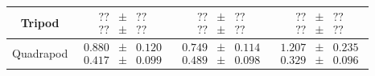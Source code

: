 \documentclass[conference]{IEEEtran}
\begin{document}
\begin{table}[t]
\begin{center}
\begin{tabular}[c]{cccc}
        \midrule
        Tripod & $\begin{matrix}??\\??\end{matrix} \begin{matrix}\pm\\\pm\end{matrix} \begin{matrix}??\\ ??\end{matrix}$ & $\begin{matrix}??\\??\end{matrix} \begin{matrix}\pm\\\pm\end{matrix} \begin{matrix}??\\ ??\end{matrix}$ & $\begin{matrix}??\\??\end{matrix} \begin{matrix}\pm\\\pm\end{matrix} \begin{matrix}??\\??\end{matrix}$ \\
        \midrule
        Quadrapod & $\begin{matrix}0.880\\0.417\end{matrix} \begin{matrix}\pm\\\pm\end{matrix} \begin{matrix}0.120\\ 0.099\end{matrix}$ & $\begin{matrix}0.749\\0.489\end{matrix} \begin{matrix}\pm\\\pm\end{matrix} \begin{matrix}0.114\\ 0.098\end{matrix}$ & $\begin{matrix}1.207\\0.329\end{matrix} \begin{matrix}\pm\\\pm\end{matrix} \begin{matrix}0.235\\0.096\end{matrix}$ \\

\end{tabular}
\end{center}
\end{table}
\end{document}
